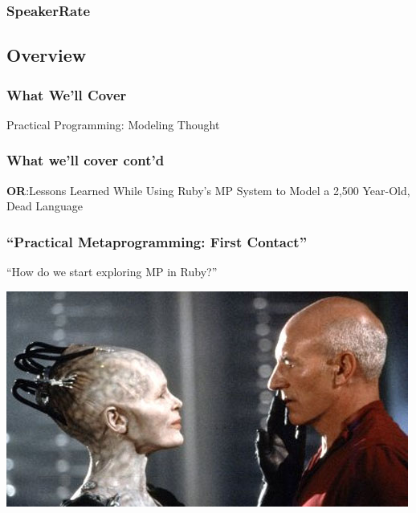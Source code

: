 \documentclass[slidestop,compress,mathserif,notes]{beamer}
\begin{document}
\begin{frame}
	\frametitle{SpeakerRate}
	\vskip 1.25cm
\end{frame}

\subsection{Overview}

\begin{frame}
	\frametitle{What We'll Cover}
	Practical Programming:  Modeling Thought
\end{frame}

\begin{frame}
	\frametitle{What we'll cover cont'd}
	\textbf{OR}:Lessons Learned While Using Ruby's MP System to Model a 2,500 Year-Old, Dead Language 
\end{frame}



\begin{frame} 
	\frametitle{``Practical Metaprogramming:  First Contact''}
  ``How do we start exploring MP in Ruby?''

	\includegraphics[scale=0.55]{img/first_contact.jpg}
\end{frame} 
\note{

}
\end{document}
